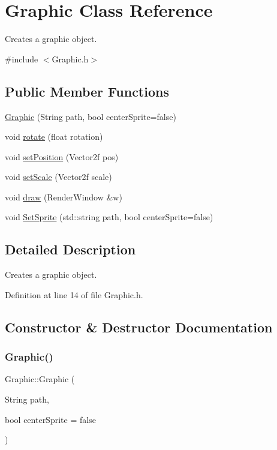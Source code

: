 \hypertarget{class_graphic}{}\section{Graphic Class Reference}
\label{class_graphic}


Creates a graphic object.  




{\ttfamily \#include $<$Graphic.\+h$>$}

\subsection*{Public Member Functions}
\begin{DoxyCompactItemize}
\item 
\hyperlink{class_graphic_a83bb982f987a5c5c70e7a6134ba855ee}{Graphic} (String path, bool center\+Sprite=false)
\item 
void \hyperlink{class_graphic_ad177824925cb750fd1b2cb8ef8e40f16}{rotate} (float rotation)
\item 
void \hyperlink{class_graphic_ab19115e7bd2f656ad4939b2a412cd4d6}{set\+Position} (Vector2f pos)
\item 
void \hyperlink{class_graphic_a681124d0e87f6e8d14211195c4832880}{set\+Scale} (Vector2f scale)
\item 
void \hyperlink{class_graphic_a5b21e6698c7fab47a5e3770a8d8747d5}{draw} (Render\+Window \&w)
\item 
void \hyperlink{class_graphic_a33969eb4051f1f51c67bf2e8d0959f2d}{Set\+Sprite} (std\+::string path, bool center\+Sprite=false)
\end{DoxyCompactItemize}


\subsection{Detailed Description}
Creates a graphic object. 

Definition at line 14 of file Graphic.\+h.



\subsection{Constructor \& Destructor Documentation}
\mbox{\label{class_graphic_a83bb982f987a5c5c70e7a6134ba855ee}} 
\subsubsection{\texorpdfstring{Graphic()}{Graphic()}}
{\footnotesize\ttfamily Graphic\+::\+Graphic (\begin{DoxyParamCaption}\item[{String}]{path,  }\item[{bool}]{center\+Sprite = {\ttfamily false} }\end{DoxyParamCaption})}



